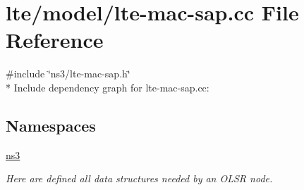 \hypertarget{lte-mac-sap_8cc}{}\section{lte/model/lte-\/mac-\/sap.cc File Reference}
\label{lte-mac-sap_8cc}
{\ttfamily \#include \char`\"{}ns3/lte-\/mac-\/sap.\+h\char`\"{}}\\*
Include dependency graph for lte-\/mac-\/sap.cc\+:
\subsection*{Namespaces}
\begin{DoxyCompactItemize}
\item 
 \hyperlink{namespacens3}{ns3}
\begin{DoxyCompactList}\small\item\em Here are defined all data structures needed by an O\+L\+SR node. \end{DoxyCompactList}\end{DoxyCompactItemize}
